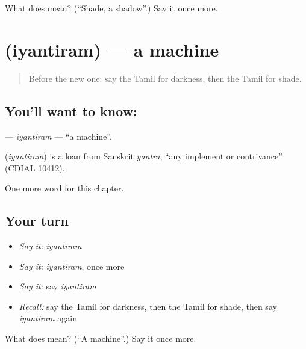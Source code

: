 \begin{tcolorbox}[breakable,colback=teal!4,colframe=teal!35!black,title={Before you move on}]
What does  mean? (\textquotedblleft{}Shade, a shadow\textquotedblright{}.) Say it once more.
\end{tcolorbox}
\section[\texorpdfstring{\ta{இயந்திரம்} (iyantiram)}{இயந்திரம் (iyantiram)}]{ (iyantiram) — a machine}

\label{lesson:TA-C276-iyantiram}



\begin{quote}
Before the new one: say the Tamil for darkness, then the Tamil for shade.
\end{quote}

\subsection*{You'll want to know: }
\textbf{} — \emph{iyantiram} — \textquotedblleft{}a machine\textquotedblright{}.

\begin{cousinweb}
\textbf{} (\emph{iyantiram}) is a loan from Sanskrit \emph{yantra}, \textquotedblleft{}any implement or contrivance\textquotedblright{} (CDIAL 10412).
\end{cousinweb}

\begin{grammarlens}[title={What you've built}]
One more word for this chapter.
\end{grammarlens}

\subsection*{Your turn}
\begin{itemize}
\raggedright
  \item \emph{Say it:} \emph{iyantiram}
  \item \emph{Say it:} \emph{iyantiram}, once more
  \item \emph{Say it:} say \emph{iyantiram}
  \item \emph{Recall:} say the Tamil for darkness, then the Tamil for shade, then say \emph{iyantiram} again
\end{itemize}

\begin{tcolorbox}[breakable,colback=teal!4,colframe=teal!35!black,title={Before you move on}]
What does  mean? (\textquotedblleft{}A machine\textquotedblright{}.) Say it once more.
\end{tcolorbox}
